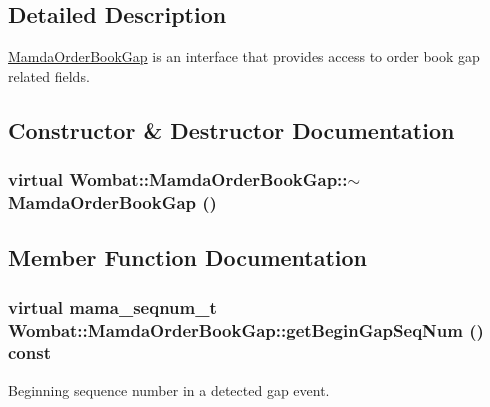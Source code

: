 \subsection{Detailed Description}
\hyperlink{classWombat_1_1MamdaOrderBookGap}{Mamda\-Order\-Book\-Gap} is an interface that provides access to order book gap related fields. 



\subsection{Constructor \& Destructor Documentation}
\hypertarget{classWombat_1_1MamdaOrderBookGap_0941369e62306f8b3ea72144f75a8cd4}{
\subsubsection[$\sim$MamdaOrderBookGap]{\setlength{\rightskip}{0pt plus 5cm}virtual Wombat::Mamda\-Order\-Book\-Gap::$\sim$Mamda\-Order\-Book\-Gap ()}}
\label{classWombat_1_1MamdaOrderBookGap_0941369e62306f8b3ea72144f75a8cd4}




\subsection{Member Function Documentation}
\hypertarget{classWombat_1_1MamdaOrderBookGap_0875bc220d82aaec977cd1dbb006cc0f}{
\subsubsection[getBeginGapSeqNum]{\setlength{\rightskip}{0pt plus 5cm}virtual mama\_\-seqnum\_\-t Wombat::Mamda\-Order\-Book\-Gap::get\-Begin\-Gap\-Seq\-Num () const}}
\label{classWombat_1_1MamdaOrderBookGap_0875bc220d82aaec977cd1dbb006cc0f}


Beginning sequence number in a detected gap event. 

